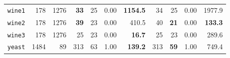 \begin{tabular}{lccrrrrrrrr}
\texttt{wine1} & \multicolumn{1}{r}{178} & \multicolumn{1}{r}{1276}  & \textbf{33} & 25 & 0.00 & \textbf{1154.5} & 34 & 25 & 0.00 & 1977.9\\
\texttt{wine2} & \multicolumn{1}{r}{178} & \multicolumn{1}{r}{1276}  & \textbf{39} & 23 & 0.00 & 410.5 & 40 & \textbf{21} & 0.00 & \textbf{133.3}\\
\texttt{wine3} & \multicolumn{1}{r}{178} & \multicolumn{1}{r}{1276}  & 25 & 23 & 0.00 & \textbf{16.7} & 25 & 23 & 0.00 & 289.6\\
\texttt{yeast} & \multicolumn{1}{r}{1484} & \multicolumn{1}{r}{89}  & 313 & 63 & 1.00 & \textbf{139.2} & 313 & \textbf{59} & 1.00 & 749.4\\
\bottomrule
\end{tabular}
